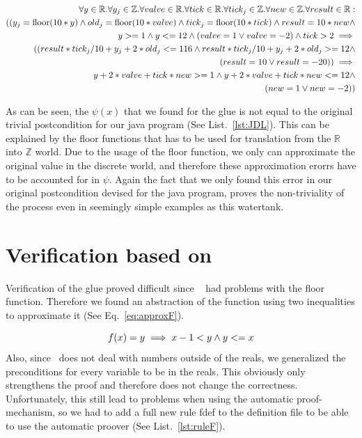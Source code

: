 \begin{equation}
	\centering
	\begin{split}
		\forall y \in \mathbb{R} . \forall y_j \in \mathbb{Z}. \forall valve \in \mathbb{R}. \forall tick \in \mathbb{R}. \forall tick_j \in \mathbb{Z} . \forall new \in \mathbb{Z}. \forall result \in \mathbb{R} : \\  ((y_j = \textrm{floor}(10 * y) \wedge old_j = \textrm{floor}(10*valve) \wedge tick_j = \textrm{floor}(10*tick) \wedge result = 10 * new \wedge \\ y >= 1 \wedge y <= 12 \wedge (valve = 1  \vee valve = -2) \wedge tick > 2 \implies \\  ((result * tick_j/10 + y_j + 2 * old_j <= 116 \wedge result * tick_j/10 + y_j + 2 * old_j >= 12 \wedge \\ (result = 10 \vee result = -20)) \implies \\ y + 2 * valve + tick * new >= 1 \wedge y + 2 * valve + tick * new <= 12 \wedge \\ (new = 1 \vee new = -2))
	\end{split}
	\label{eq:glueWatertank}
\end{equation}

As can be seen, the \(\psi(x)\) that we found for the glue is not equal to the original trivial postcondition for our java program (See List.~\ref{lst:JDL}). This can be explained by the floor functions that has to be used for translation from the \(\mathbb{R}\) into \(\mathbb{Z}\) world. Due to the usage of the floor function, we only can approximate the original value in the discrete world, and therefore these approximation erorrs have to be accounted for in \(\psi\). Again the fact that we only found this error in our original postcondition devised for the java program, proves the non-triviality of the process even in seemingly simple examples as this watertank.

\section{Verification based on \keym}
\label{sec:Watertank:Verification}

Verification of the glue proved difficult since \keym~ had problems with the floor function. Therefore we found an abstraction of the function using two inequalities to approximate it (See Eq.~\ref{eq:approxF}). 

\begin{equation}
	\centering
		f(x) = y \implies x-1 < y \wedge y <= x
	\label{eq:approxF}
\end{equation}
Also, since \keym~does not deal with numbers outside of the reals, we generalized the preconditions for every variable to be in the reals. This obviously only strengthens the proof and therefore does not change the correctness.
Unfortunately, this still lead to problems when using the automatic proof-mechanism, so we had to add a full new rule fdef to the definition file to be able to use the automatic proover (See List.~\ref{lst:ruleF}).

